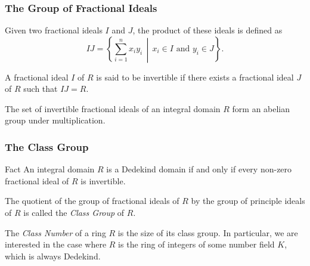 \documentclass{beamer}
\begin{document}
\begin{frame}
	
	\frametitle{The Group of Fractional Ideals}

	\begin{definition}
		Given two fractional ideals $I$ and $J$, the product of these ideals is defined as
		\[
			IJ = \left\{ \sum_{i = 1}^{n} x_i y_i \,\middle|\, x_i \in I \text{ and } y_i \in J \right\}.
		\]
	\end{definition}
	\pause

	\begin{definition}
		A fractional ideal $I$ of $R$ is said to be invertible if there exists a fractional ideal $J$ of $R$ such that $IJ = R$.
	\end{definition}
	\pause

	\begin{definition}
		The set of invertible fractional ideals of an integral domain $R$ form an abelian group under multiplication. 
	\end{definition}	

\end{frame}

\begin{frame}

	\frametitle{The Class Group}

	\begin{block}{Fact}
		An integral domain $R$ is a Dedekind domain if and only if every non-zero fractional ideal of $R$ is invertible.
	\end{block}
	\pause

	\begin{definition}
		The quotient of the group of fractional ideals of $R$ by the group of principle ideals of $R$ is called the \emph{Class Group} of $R$.
	\end{definition}
	\pause

	\begin{definition}
		The \emph{Class Number} of a ring $R$ is the size of its class group. In particular, we are interested in the case where $R$ is the ring of integers of some number field $K$, which is always Dedekind.
	\end{definition}
	
\end{frame}
\end{document}
